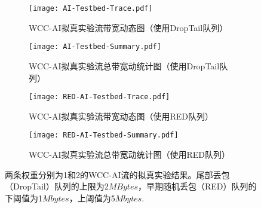\documentclass[winfonts]{njuthesis}
\begin{document}
\begin{figure*}[ht]
	\begin{subfigure}{.5\textwidth}
    \centering
		\texttt{[image: AI-Testbed-Trace.pdf]}
    \label{fig:AI-TestbedTrace}
    \caption{WCC-AI拟真实验流带宽动态图（使用DropTail队列）}
  \end{subfigure}
	\begin{subfigure}{.5\textwidth}
    \centering
		\texttt{[image: AI-Testbed-Summary.pdf]}
    \label{fig:AI-TestbedSum}
    \caption{WCC-AI拟真实验流总带宽动统计图（使用DropTail队列）}
  \end{subfigure}
  \begin{subfigure}{.5\textwidth}
    \centering
		\texttt{[image: RED-AI-Testbed-Trace.pdf]}
    \label{fig:RED-AI-TestbedTrace}
    \caption{WCC-AI拟真实验流带宽动态图（使用RED队列）}
  \end{subfigure}
	\begin{subfigure}{.5\textwidth}
    \centering
		\texttt{[image: RED-AI-Testbed-Summary.pdf]}
    \label{fig:RED-AI-TestbedSum}
    \caption{WCC-AI拟真实验流总带宽动统计图（使用RED队列）}
  \end{subfigure}
  \caption{两条权重分别为1和2的WCC-AI流的拟真实验结果。尾部丢包（DropTail）队列的上限为2$MBytes$，早期随机丢包（RED）队列的下阈值为1$Mbytes$，上阈值为5$Mbytes$.}
	\label{fig:TestbedExp}
\end{figure*}
\end{document}
